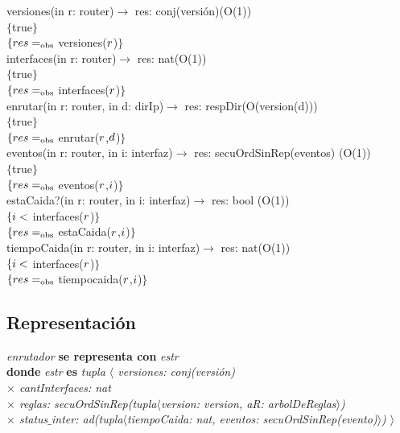 versiones(in r: router)$\longrightarrow$ res: conj(versi\'on)\hfill(O(1)) \\
$\{$true$\}$\\
$\{{res}=_{\mathrm{obs}}$ versiones(${r}$)$\}$\\

interfaces(in r: router)$\longrightarrow$ res: nat\hfill(O(1)) \\
$\{$true$\}$\\
$\{{res} =_{\mathrm{obs}}$ interfaces(${r}$)$\}$\\

enrutar(in r: router, in d: dirIp)$\longrightarrow$ res: respDir\hfill(O(version(d))) \\
$\{$true$\}$\\
$\{{res} =_{\mathrm{obs}}$ enrutar(${r}$,${d}$)$\}$\\

eventos(in r: router, in i: interfaz)$\longrightarrow$ res: secuOrdSinRep(eventos) \hfill(O(1)) \\
$\{$true$\}$\\
$\{{res} =_{\mathrm{obs}}$ eventos(${r}$,${i}$)$\}$\\

estaCaida?(in r: router, in i: interfaz)$\longrightarrow$ res: bool \hfill(O(1)) \\
$\{{i} <$ interfaces(${r}$)$\}$\\
$\{{res} =_{\mathrm{obs}}$ estaCaida(${r}$,${i}$)$\}$\\

tiempoCaida(in r: router, in i: interfaz)$\longrightarrow$ res: nat\hfill(O(1)) \\
$\{{i} <$ interfaces(${r}$)$\}$\\
$\{{res} =_{\mathrm{obs}}$ tiempocaida(${r}$,${i}$)$\}$\\


\subsection*{Representaci\'on}
\textit{enrutador} \textbf{se representa con} \textit{estr}\\
\textbf{donde} \textit{estr} \textbf{es} \textit{tupla $\langle$ versiones: conj(versi\'on)\\
\hspace*{3.5cm} $\times$  cantInterfaces: nat\\
\hspace*{3.5cm} $\times$  reglas: secuOrdSinRep(tupla$\langle$version: version, aR: arbolDeReglas$\rangle$)\\ %
\hspace*{3.5cm} $\times$  status$\_$inter: ad(tupla$\langle$tiempoCaida: nat, eventos: secuOrdSinRep(evento)$\rangle$) $\rangle$}
\vspace{33pt}

